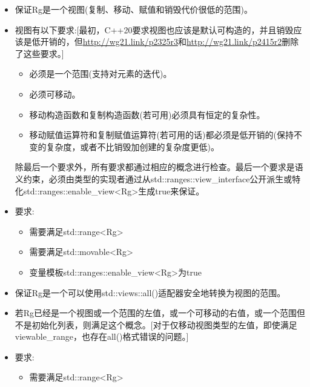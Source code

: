 \begin{itemize}
\item
保证Rg是一个视图(复制、移动、赋值和销毁代价很低的范围)。

\item
视图有以下要求:[最初，C++20要求视图也应该是默认可构造的，并且销毁应该是低开销的，但\url{http://wg21.link/p2325r3}和\url{http://wg21.link/p2415r2}删除了这些要求。]

\begin{itemize}
\item
必须是一个范围(支持对元素的迭代)。

\item
必须可移动。

\item
移动构造函数和复制构造函数(若可用)必须具有恒定的复杂性。

\item
移动赋值运算符和复制赋值运算符(若可用的话)都必须是低开销的(保持不变的复杂度，或者不比销毁加创建的复杂度更低)。
\end{itemize}

除最后一个要求外，所有要求都通过相应的概念进行检查。最后一个要求是语义约束，必须由类型的实现者通过从std::ranges::view\_interface公开派生或特化std::ranges::enable\_view<Rg>生成true来保证。

\item
要求:

\begin{itemize}
\item
需要满足std::range<Rg>

\item
需要满足std::movable<Rg>

\item
变量模板std::ranges::enable\_view<Rg>为true
\end{itemize}
\end{itemize}


\begin{itemize}
\item
保证Rg是一个可以使用std::views::all()适配器安全地转换为视图的范围。

\item
若Rg已经是一个视图或一个范围的左值，或一个可移动的右值，或一个范围但不是初始化列表，则满足这个概念。[对于仅移动视图类型的左值，即使满足viewable\_range，也存在all()格式错误的问题。]

\item
要求:

\begin{itemize}
\item
需要满足std::range<Rg>

\end{itemize}
\end{itemize}

